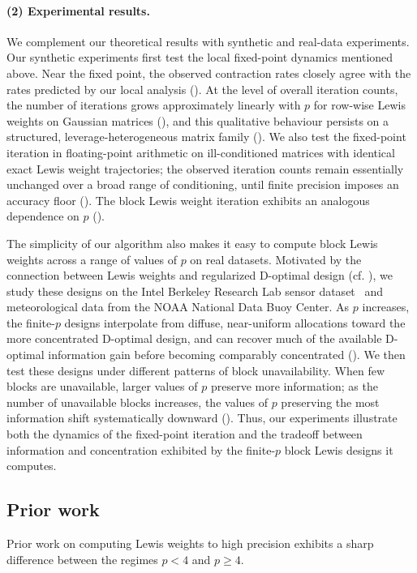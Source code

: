 \documentclass[11pt]{article}
\theoremstyle{plain}
\numberwithin{equation}{section}
\begin{document}
\paragraph{(2) Experimental results.}
We complement our theoretical results with synthetic and real-data experiments. 
Our synthetic experiments first test the local fixed-point dynamics mentioned above. 
Near the fixed point, the observed contraction rates closely agree with the rates predicted by our local analysis (). 
At the level of overall iteration counts, the number of iterations grows approximately linearly with $p$ for row-wise Lewis weights on Gaussian matrices (), and this qualitative behaviour persists on a structured, leverage-heterogeneous matrix family (). 
We also test the fixed-point iteration in floating-point arithmetic on ill-conditioned matrices with identical exact Lewis weight trajectories; the observed iteration counts remain essentially unchanged over a broad range of conditioning, until finite precision imposes an accuracy floor (). 
The block Lewis weight iteration exhibits an analogous dependence on $p$ (). 

The simplicity of our algorithm also makes it easy to compute block Lewis weights across a range of values of $p$ on real datasets. 
Motivated by the connection between Lewis weights and regularized D-optimal design (cf. ), we study these designs on the Intel Berkeley Research Lab sensor dataset~\cite{guestrin2004distributed} and meteorological data from the NOAA National Data Buoy Center. 
As $p$ increases, the finite-$p$ designs interpolate from diffuse, near-uniform allocations toward the more concentrated D-optimal design, and can recover much of the available D-optimal information gain before becoming comparably concentrated (). 
We then test these designs under different patterns of block unavailability. 
When few blocks are unavailable, larger values of $p$ preserve more information; as the number of unavailable blocks increases, the values of $p$ preserving the most information shift systematically downward ().
Thus, our experiments illustrate both the dynamics of the fixed-point iteration and the tradeoff between information and concentration exhibited by the finite-$p$ block Lewis designs it computes.

\subsection{Prior work}\label{sec:intro-approachOverview}
Prior work on computing Lewis weights to high precision exhibits a sharp difference between the regimes $p<4$ and  $p\geq 4$.
\end{document}
